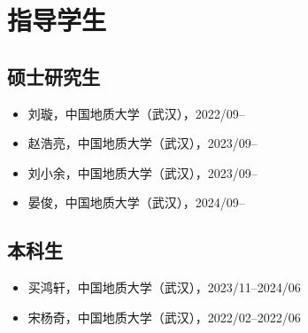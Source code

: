 \section{指导学生}

\subsection{硕士研究生}
\begin{itemize}
\item 刘璇，中国地质大学（武汉），2022/09--
\item 赵浩亮，中国地质大学（武汉），2023/09--
\item 刘小余，中国地质大学（武汉），2023/09--
\item 晏俊，中国地质大学（武汉），2024/09--
\end{itemize}

\subsection{本科生}
\begin{itemize}
\item 买鸿轩，中国地质大学（武汉），2023/11--2024/06
\item 宋杨奇，中国地质大学（武汉），2022/02--2022/06
\end{itemize}
